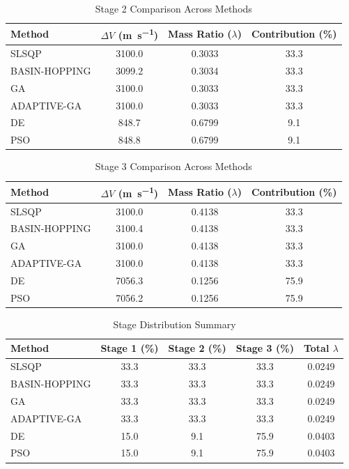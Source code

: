 \documentclass{article}
\begin{document}
\begin{table}[H]
\centering
\caption{Stage 2 Comparison Across Methods}
\begin{tabular}{lS[table-format=4.1]S[table-format=1.4]S[table-format=3.1]}
\toprule
Method & {$\Delta V$ (\si{\meter\per\second})} & {Mass Ratio ($\lambda$)} & {Contribution (\%)} \\
\midrule
SLSQP        & 3100.0 & 0.3033 & 33.3 \\
BASIN-HOPPING & 3099.2 & 0.3034 & 33.3 \\
GA           & 3100.0 & 0.3033 & 33.3 \\
ADAPTIVE-GA  & 3100.0 & 0.3033 & 33.3 \\
DE           & 848.7 & 0.6799 & 9.1 \\
PSO          & 848.8 & 0.6799 & 9.1 \\
\bottomrule
\end{tabular}
\end{table}

\begin{table}[H]
\centering
\caption{Stage 3 Comparison Across Methods}
\begin{tabular}{lS[table-format=4.1]S[table-format=1.4]S[table-format=3.1]}
\toprule
Method & {$\Delta V$ (\si{\meter\per\second})} & {Mass Ratio ($\lambda$)} & {Contribution (\%)} \\
\midrule
SLSQP        & 3100.0 & 0.4138 & 33.3 \\
BASIN-HOPPING & 3100.4 & 0.4138 & 33.3 \\
GA           & 3100.0 & 0.4138 & 33.3 \\
ADAPTIVE-GA  & 3100.0 & 0.4138 & 33.3 \\
DE           & 7056.3 & 0.1256 & 75.9 \\
PSO          & 7056.2 & 0.1256 & 75.9 \\
\bottomrule
\end{tabular}
\end{table}

\begin{table}[H]
\centering
\caption{Stage Distribution Summary}
\begin{tabular}{lS[table-format=4.1]S[table-format=4.1]S[table-format=4.1]S[table-format=1.4]}
\toprule
Method & {Stage 1 (\%)} & {Stage 2 (\%)} & {Stage 3 (\%)} & {Total $\lambda$} \\
\midrule
SLSQP        & 33.3 & 33.3 & 33.3 & 0.0249 \\
BASIN-HOPPING & 33.3 & 33.3 & 33.3 & 0.0249 \\
GA           & 33.3 & 33.3 & 33.3 & 0.0249 \\
ADAPTIVE-GA  & 33.3 & 33.3 & 33.3 & 0.0249 \\
DE           & 15.0 & 9.1 & 75.9 & 0.0403 \\
PSO          & 15.0 & 9.1 & 75.9 & 0.0403 \\
\bottomrule
\end{tabular}
\end{table}
\end{document}
